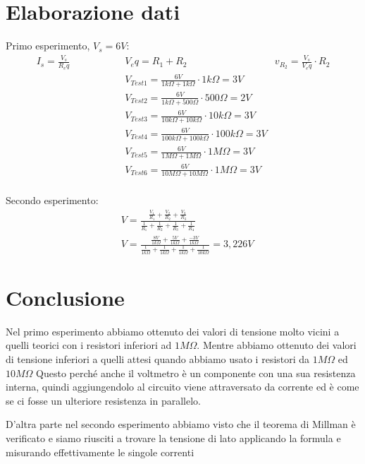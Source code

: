     \section{Elaborazione dati}
    Primo esperimento, $V_s = 6V$:
    \begin{align*}
        I_s = \frac{V_s}{R_eq}  \hspace{2cm}   & V_eq = R_1 + R_2   \hspace{2cm} & v_{R_2} = \frac{V_s}{V_eq} \cdot R_2 \\
        & V_{Test1} = \frac{6V}{1k\Omega + 1k\Omega} \cdot 1k\Omega = 3V \\
        & V_{Test2} = \frac{6V}{1k\Omega + 500\Omega} \cdot 500\Omega = 2V \\
        & V_{Test3} = \frac{6V}{10k\Omega + 10k\Omega} \cdot 10k\Omega = 3V \\
        & V_{Test4} = \frac{6V}{100k\Omega + 100k\Omega} \cdot 100k\Omega = 3V \\
        & V_{Test5} = \frac{6V}{1M\Omega + 1M\Omega} \cdot 1M\Omega = 3V \\
        & V_{Test6} = \frac{6V}{10M\Omega + 10M\Omega} \cdot 1M\Omega = 3V \\
    \end{align*}

    Secondo esperimento:
    \begin{align*}
       & V = \frac{\frac{V_1}{R_1} + \frac{V_2}{R_2} + \frac{V_3}{R_3}}{\frac{1}{R_1} + \frac{1}{R_2} + \frac{1}{R_3} + \frac{1}{R_4}}\\
       & V = \frac{\frac{8V}{1k\Omega} + \frac{5V}{1k\Omega} + \frac{-3V}{1k\Omega}}{\frac{1}{1k\Omega} + \frac{1}{1k\Omega} + \frac{1}{1k\Omega} + \frac{1}{10k\Omega}} = 3,226V
    \end{align*}
    


    \section{Conclusione}
    Nel primo esperimento abbiamo ottenuto dei valori di tensione molto vicini a quelli teorici con i resistori inferiori ad $1M\Omega$.
    Mentre abbiamo ottenuto dei valori di tensione inferiori a quelli attesi quando abbiamo usato i resistori da $1M\Omega$ ed $10M\Omega$
    Questo perché anche il voltmetro è un componente con una sua resistenza interna, quindi aggiungendolo al circuito
    viene attraversato da corrente ed è come se ci fosse un ulteriore resistenza in parallelo.

    D'altra parte nel secondo esperimento abbiamo visto che il teorema di Millman è verificato e siamo riusciti a trovare la tensione
    di lato applicando la formula e misurando effettivamente le singole correnti 


